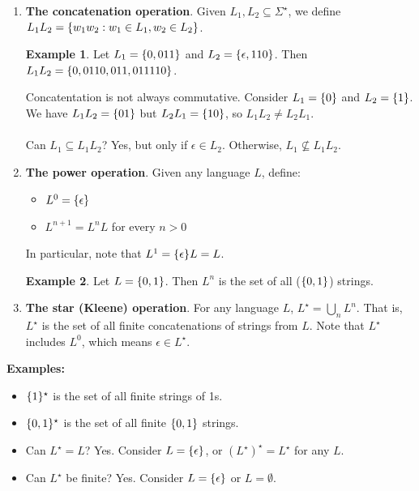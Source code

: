 \documentclass[]{article}
\DeclarePairedDelimiter{\set}{\lbrace}{\rbrace}
\theoremstyle{definition}
\newtheorem{ex}{Example}[section]
\begin{document}
          \begin{enumerate}
            \item \textbf{The concatenation operation}. Given $L_1, L_2 \subseteq \Sigma^\star$, we define $L_1 L_2 = \set{ w_1 w_2 : w_1 \in L_1, w_2 \in L_2 }$.

            \begin{ex}
            Let $L_1 = \set{0, 011}$ and $L_2 = \set{ \epsilon, 110 }$. Then $L_1 L_2 = \set{0, 0110, 011, 011110 }$.
            \end{ex}

            Concatentation is not always commutative. Consider $L_1 = \set{0}$ and $L_2 = \set{1}$. We have $L_1 L_2 = \set{01}$ but $L_2 L_1 = \set{10}$, so $L_1 L_2 \ne L_2 L_1$.
            \\ \\
            Can $L_1 \subseteq L_1 L_2$? Yes, but only if $\epsilon \in L_2$. Otherwise, $L_1 \not \subseteq L_1 L_2$.

            \item \textbf{The power operation}. Given any language $L$, define:
              \begin{itemize}
                \item $L^0 = \set{ \epsilon }$
                \item $L^{n + 1} = L^n L$ for every $n > 0$
              \end{itemize}

              In particular, note that $L^1 = \set{ \epsilon} L = L$.

              \begin{ex}
                Let $L = \set{ 0, 1 }$. Then $L^n$ is the set of all ($\set{0, 1}$) strings.
              \end{ex}

            \item \textbf{The star (Kleene) operation}. For any language $L$, $L^\star = \displaystyle \bigcup_n L^n$. That is, $L^\star$ is the set of all finite concatenations of strings from $L$. Note that $L^\star$ includes $L^0$, which means $\epsilon \in L^\star$.
          \end{enumerate}

          \noindent \textbf{Examples:}
            \begin{itemize}
              \item $\set{1}^\star$ is the set of all finite strings of 1s.
              \item $\set{0, 1}^\star$ is the set of all finite $\set{0, 1}$ strings.
              \item Can $L^\star = L$? Yes. Consider $L = \set{ \epsilon }$, or $(L^\star)^\star = L^\star$ for any $L$.
              \item Can $L^\star$ be finite? Yes. Consider $L = \set{ \epsilon }$ or $L = \emptyset$.
            \end{itemize}
\end{document}
